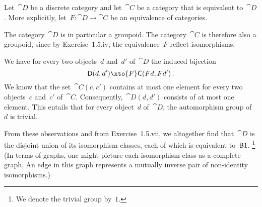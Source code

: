 \subsection{}

Let~$\cat{D}$ be a discrete category and let~$\cat{C}$ be a category that is equivalent to~$\cat{D}$.
More explicitly, let~$F \colon \cat{D} \to \cat{C}$ be an equivalence of categories.

The category~$\cat{D}$ is in particular a groupoid.
The category~$\cat{C}$ is therefore also a groupoid, since by Exercise~1.5.iv, the equivalence~$F$ reflect isomorphisms.

We have for every two objects~$d$ and~$d'$ of~$\cat{D}$ the induced bijection
\[
	\cat{D}(d, d') \xto{F} \cat{C}(F d, F d') \,.
\]
We know that the set~$\cat{C}(c, c')$ contains at most one element for every two objects~$c$ and~$c'$ of~$\cat{C}$.
Consequently,~$\cat{D}(d, d')$ consists of at most one element.
This entails that for every object~$d$ of~$\cat{D}$, the automorphism group of~$d$ is trivial.

From these observations and from Exercise~1.5.vii, we altogether find that~$\cat{D}$ is the disjoint union of its isomorphism classes, each of which is equivalent to~$\mathsf{B} 1$.%
\footnote{We denote the trivial group by~$1$.}
(In terms of graphs, one might picture each isomorphism class as a complete graph.
An edge in this graph represents a mutually inverse pair of non-identity isomorphisms.)
